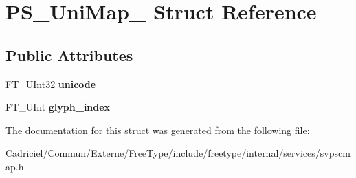 \hypertarget{struct_p_s___uni_map__}{}\section{P\+S\+\_\+\+Uni\+Map\+\_\+ Struct Reference}
\label{struct_p_s___uni_map__}
\subsection*{Public Attributes}
\begin{DoxyCompactItemize}
\item 
F\+T\+\_\+\+U\+Int32 {\bfseries unicode}\hypertarget{struct_p_s___uni_map___a87c1f471eb4033fc5ed9d0f1ecaf35a1}{}\label{struct_p_s___uni_map___a87c1f471eb4033fc5ed9d0f1ecaf35a1}

\item 
F\+T\+\_\+\+U\+Int {\bfseries glyph\+\_\+index}\hypertarget{struct_p_s___uni_map___a0d5b2e3c405aeab1f1059a3587125cfd}{}\label{struct_p_s___uni_map___a0d5b2e3c405aeab1f1059a3587125cfd}

\end{DoxyCompactItemize}


The documentation for this struct was generated from the following file\+:\begin{DoxyCompactItemize}
\item 
Cadriciel/\+Commun/\+Externe/\+Free\+Type/include/freetype/internal/services/svpscmap.\+h\end{DoxyCompactItemize}
